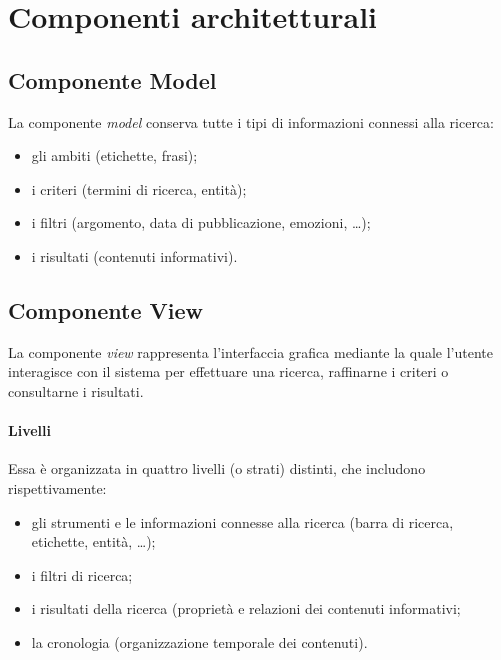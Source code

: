 \documentclass[10pt,a4paper,headinclude,footinclude,hidelinks]{scrreprt} %
\begin{document}
	\section{Componenti architetturali}
	\label{sec:stage:design:mvc}

	\subsection{Componente Model}
	\label{sec:stage:design:mvc:model}
	La componente \textit{model} conserva tutte i tipi di informazioni connessi alla ricerca:
	\begin{itemize}
	\item gli ambiti (etichette, frasi);
	\item i criteri (termini di ricerca, entità);
	\item i filtri (argomento, data di pubblicazione, emozioni, \ldots);
	\item i risultati (contenuti informativi).
	\end{itemize}

	\subsection{Componente View}
	\label{sec:stage:design:mvc:view}
	La componente \textit{view} rappresenta l'interfaccia grafica mediante la quale l'utente interagisce con il sistema per effettuare una ricerca, raffinarne i criteri o consultarne i risultati.

	\paragraph{Livelli}
	Essa è organizzata in quattro livelli (o strati) distinti, che includono rispettivamente:
	\begin{itemize}
	\item gli strumenti e le informazioni connesse alla ricerca (barra di ricerca, etichette, entità, \ldots);
	\item i filtri di ricerca;
	\item i risultati della ricerca (proprietà e relazioni dei contenuti informativi;
	\item la cronologia (organizzazione temporale dei contenuti).
	\end{itemize}
\end{document}

